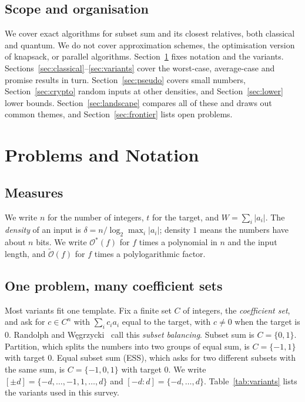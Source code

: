 \documentclass[11pt]{article}
\newcommand{\Oh}{\mathcal{O}}
\newcommand{\Ot}{\tilde{\mathcal{O}}}
\begin{document}
\subsection{Scope and organisation}
We cover exact algorithms for subset sum and its closest relatives, both
classical and quantum. We do not cover approximation schemes, the optimisation
version of knapsack, or parallel algorithms. Section~\ref{sec:prelim} fixes
notation and the variants. Sections~\ref{sec:classical}--\ref{sec:variants}
cover the worst-case, average-case and promise results in turn.
Section~\ref{sec:pseudo} covers small numbers, Section~\ref{sec:crypto} random
inputs at other densities, and Section~\ref{sec:lower} lower bounds.
Section~\ref{sec:landscape} compares all of these and draws out common themes,
and Section~\ref{sec:frontier} lists open problems.

\section{Problems and Notation}\label{sec:prelim}

\subsection{Measures}
We write $n$ for the number of integers, $t$ for the target, and
$W=\sum_i|a_i|$. The \emph{density} of an input is
$\delta=n/\log_2\max_i|a_i|$; density $1$ means the numbers have about $n$ bits.
We write $\Oh^*(f)$ for $f$ times a polynomial in $n$ and the input length, and
$\Ot(f)$ for $f$ times a polylogarithmic factor.

\subsection{One problem, many coefficient sets}
Most variants fit one template. Fix a finite set $C$ of integers, the
\emph{coefficient set}, and ask for $c\in C^n$ with $\sum_ic_ia_i$ equal to the
target, with $c\neq0$ when the target is $0$. Randolph and
W\k{e}grzycki~\cite{rw} call this \emph{subset balancing}. Subset sum is
$C=\{0,1\}$. Partition, which splits the numbers into two groups of equal sum,
is $C=\{-1,1\}$ with target $0$. Equal subset sum (ESS), which asks for two
different subsets with the same sum, is $C=\{-1,0,1\}$ with target $0$. We
write $[\pm d]=\{-d,\dots,-1,1,\dots,d\}$ and $[-d:d]=\{-d,\dots,d\}$.
Table~\ref{tab:variants} lists the variants used in this survey.
\end{document}
